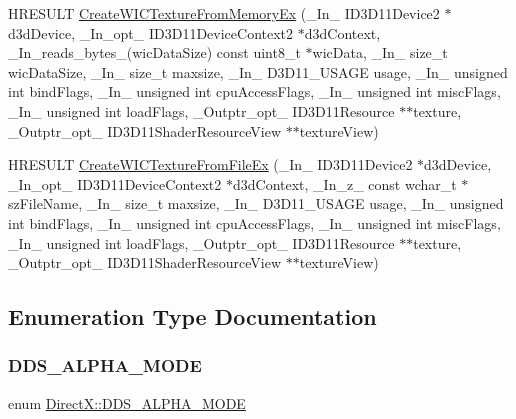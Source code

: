 \begin{DoxyCompactItemize}
\item 
H\+R\+E\+S\+U\+LT \hyperlink{namespace_direct_x_a56c6c2a3415187c10b1d132c782d3dae}{Create\+W\+I\+C\+Texture\+From\+Memory\+Ex} (\+\_\+\+In\+\_\+ I\+D3\+D11\+Device2 $\ast$d3d\+Device, \+\_\+\+In\+\_\+opt\+\_\+ I\+D3\+D11\+Device\+Context2 $\ast$d3d\+Context, \+\_\+\+In\+\_\+reads\+\_\+bytes\+\_\+(wic\+Data\+Size) const uint8\+\_\+t $\ast$wic\+Data, \+\_\+\+In\+\_\+ size\+\_\+t wic\+Data\+Size, \+\_\+\+In\+\_\+ size\+\_\+t maxsize, \+\_\+\+In\+\_\+ D3\+D11\+\_\+\+U\+S\+A\+GE usage, \+\_\+\+In\+\_\+ unsigned int bind\+Flags, \+\_\+\+In\+\_\+ unsigned int cpu\+Access\+Flags, \+\_\+\+In\+\_\+ unsigned int misc\+Flags, \+\_\+\+In\+\_\+ unsigned int load\+Flags, \+\_\+\+Outptr\+\_\+opt\+\_\+ I\+D3\+D11\+Resource $\ast$$\ast$texture, \+\_\+\+Outptr\+\_\+opt\+\_\+ I\+D3\+D11\+Shader\+Resource\+View $\ast$$\ast$texture\+View)
\item 
H\+R\+E\+S\+U\+LT \hyperlink{namespace_direct_x_a96a7ff34dbcd0fea3340be2ed1feaa60}{Create\+W\+I\+C\+Texture\+From\+File\+Ex} (\+\_\+\+In\+\_\+ I\+D3\+D11\+Device2 $\ast$d3d\+Device, \+\_\+\+In\+\_\+opt\+\_\+ I\+D3\+D11\+Device\+Context2 $\ast$d3d\+Context, \+\_\+\+In\+\_\+z\+\_\+ const wchar\+\_\+t $\ast$sz\+File\+Name, \+\_\+\+In\+\_\+ size\+\_\+t maxsize, \+\_\+\+In\+\_\+ D3\+D11\+\_\+\+U\+S\+A\+GE usage, \+\_\+\+In\+\_\+ unsigned int bind\+Flags, \+\_\+\+In\+\_\+ unsigned int cpu\+Access\+Flags, \+\_\+\+In\+\_\+ unsigned int misc\+Flags, \+\_\+\+In\+\_\+ unsigned int load\+Flags, \+\_\+\+Outptr\+\_\+opt\+\_\+ I\+D3\+D11\+Resource $\ast$$\ast$texture, \+\_\+\+Outptr\+\_\+opt\+\_\+ I\+D3\+D11\+Shader\+Resource\+View $\ast$$\ast$texture\+View)
\end{DoxyCompactItemize}


\subsection{Enumeration Type Documentation}
\hypertarget{namespace_direct_x_a7cb48689d75471680c0bf7f79caaaf1f}{}\label{namespace_direct_x_a7cb48689d75471680c0bf7f79caaaf1f} 
\subsubsection{\texorpdfstring{D\+D\+S\+\_\+\+A\+L\+P\+H\+A\+\_\+\+M\+O\+DE}{DDS\_ALPHA\_MODE}}
{\footnotesize\ttfamily enum \hyperlink{namespace_direct_x_a7cb48689d75471680c0bf7f79caaaf1f}{Direct\+X\+::\+D\+D\+S\+\_\+\+A\+L\+P\+H\+A\+\_\+\+M\+O\+DE}}

